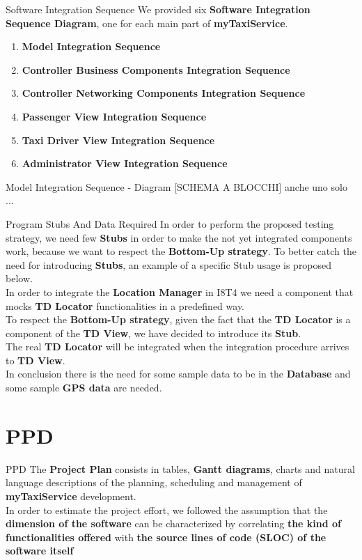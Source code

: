 \documentclass{../common/latex_classes/pdf_presentation}
\begin{document}
	\begin{frame}{Software Integration Sequence}
		We provided six \textbf{Software Integration Sequence Diagram}, one for each main part of \textbf{myTaxiService}.
		\begin{enumerate}
			\item \textbf{Model Integration Sequence}
			\item \textbf{Controller Business Components Integration Sequence}
			\item \textbf{Controller Networking Components Integration Sequence}
			\item \textbf{Passenger View Integration Sequence}
			\item \textbf{Taxi Driver View Integration Sequence}
			\item \textbf{Administrator View Integration Sequence}
		\end{enumerate}
	\end{frame}
	\begin{frame}{Model Integration Sequence - Diagram}
		[SCHEMA A BLOCCHI] anche uno solo ...
	\end{frame}
	\begin{frame}{Program Stubs And Data Required}
		In order to perform the proposed testing strategy, we need few \textbf{Stubs} in order to make the not yet integrated components work, because we want to respect the \textbf{Bottom-Up strategy}.
		\medskip
		To better catch the need for introducing \textbf{Stubs}, an example of a specific Stub usage is proposed below.\\
		In order to integrate the \textbf{Location Manager} in I8T4 we need a component that mocks \textbf{TD Locator} functionalities in a predefined way. \\
		To respect the \textbf{Bottom-Up strategy}, given the fact that the \textbf{TD Locator} is a component of the \textbf{TD View}, we have decided to introduce its \textbf{Stub}. \\
		The real \textbf{TD Locator} will be integrated when the integration procedure arrives to \textbf{TD View}.\\
		\medskip
		In conclusion there is the need for some sample data to be in the \textbf{Database} and some sample \textbf{GPS data} are needed.
	\end{frame}
	
	\section{PPD}
	\begin{frame}{PPD}
		The \textbf{Project Plan} consists in tables, \textbf{Gantt diagrams}, charts and natural language descriptions of the planning, scheduling and management of \textbf{myTaxiService} development. \\
		\medskip
		In order to estimate the project effort, we followed the assumption that the \textbf{dimension of the software} can be characterized by correlating \textbf{the kind of functionalities offered} with \textbf{the source lines of code (SLOC) of the software itself}
	\end{frame}
	
\end{document}
